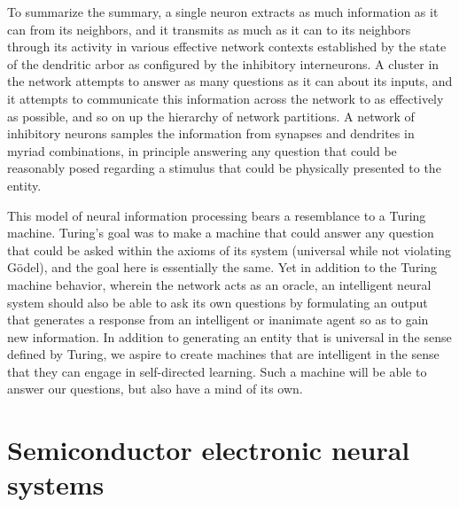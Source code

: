 \documentclass[twocolumn]{article}
\begin{document}
To summarize the summary, a single neuron extracts as much information as it can from its neighbors, and it transmits as much as it can to its neighbors through its activity in various effective network contexts established by the state of the dendritic arbor as configured by the inhibitory interneurons. A cluster in the network attempts to answer as many questions as it can about its inputs, and it attempts to communicate this information across the network to as effectively as possible, and so on up the hierarchy of network partitions. A network of inhibitory neurons samples the information from synapses and dendrites in myriad combinations, in principle answering any question that could be reasonably posed regarding a stimulus that could be physically presented to the entity. 

This model of neural information processing bears a resemblance to a Turing machine. Turing's goal was to make a machine that could answer any question that could be asked within the axioms of its system (universal while not violating G\"{o}del), and the goal here is essentially the same. Yet in addition to the Turing machine behavior, wherein the network acts as an oracle, an intelligent neural system should also be able to ask its own questions by formulating an output that generates a response from an intelligent or inanimate agent so as to gain new information. In addition to generating an entity that is universal in the sense defined by Turing, we aspire to create machines that are intelligent in the sense that they can engage in self-directed learning. Such a machine will be able to answer our questions, but also have a mind of its own.

\section{\label{sec:electronics}Semiconductor electronic neural systems}
\end{document}
